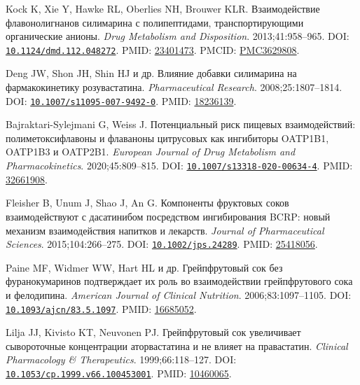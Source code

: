\documentclass[11pt]{article}
\begin{document}
\begin{description}[before={\microtypesetup{expansion=false}\setlength{\RaggedRightRightskip}{0pt plus 4em}\RaggedRight}]
\item[{[85]}] Kock K, Xie Y, Hawke RL, Oberlies NH, Brouwer KLR. Взаимодействие флавонолигнанов силимарина с полипептидами, транспортирующими органические анионы. \textit{\foreignlanguage{english}{Drug Metabolism and Disposition}}. 2013;41:958--965. DOI: \href{https://doi.org/10.1124/dmd.112.048272}{\nolinkurl{10.1124/dmd.112.048272}}. PMID: \href{https://pubmed.ncbi.nlm.nih.gov/23401473/}{23401473}. PMCID: \href{https://pmc.ncbi.nlm.nih.gov/articles/PMC3629808/}{PMC3629808}.
\item[{[86]}] Deng JW, Shon JH, Shin HJ и др. Влияние добавки силимарина на фармакокинетику розувастатина. \textit{\foreignlanguage{english}{Pharmaceutical Research}}. 2008;25:1807--1814. DOI: \href{https://doi.org/10.1007/s11095-007-9492-0}{\nolinkurl{10.1007/s11095-007-9492-0}}. PMID: \href{https://pubmed.ncbi.nlm.nih.gov/18236139/}{18236139}.
\item[{[87]}] Bajraktari-Sylejmani G, Weiss J. Потенциальный риск пищевых взаимодействий: полиметоксифлавоны и флаваноны цитрусовых как ингибиторы OATP1B1, OATP1B3 и OATP2B1. \textit{\foreignlanguage{english}{European Journal of Drug Metabolism and Pharmacokinetics}}. 2020;45:809--815. DOI: \href{https://doi.org/10.1007/s13318-020-00634-4}{\nolinkurl{10.1007/s13318-020-00634-4}}. PMID: \href{https://pubmed.ncbi.nlm.nih.gov/32661908/}{32661908}.
\item[{[88]}] Fleisher B, Unum J, Shao J, An G. Компоненты фруктовых соков взаимодействуют с дасатинибом посредством ингибирования BCRP: новый механизм взаимодействия напитков и лекарств. \textit{\foreignlanguage{english}{Journal of Pharmaceutical Sciences}}. 2015;104:266--275. DOI: \href{https://doi.org/10.1002/jps.24289}{\nolinkurl{10.1002/jps.24289}}. PMID: \href{https://pubmed.ncbi.nlm.nih.gov/25418056/}{25418056}.
\item[{[89]}] Paine MF, Widmer WW, Hart HL и др. Грейпфрутовый сок без фуранокумаринов подтверждает их роль во взаимодействии грейпфрутового сока и фелодипина. \textit{\foreignlanguage{english}{American Journal of Clinical Nutrition}}. 2006;83:1097--1105. DOI: \href{https://doi.org/10.1093/ajcn/83.5.1097}{\nolinkurl{10.1093/ajcn/83.5.1097}}. PMID: \href{https://pubmed.ncbi.nlm.nih.gov/16685052/}{16685052}.
\item[{[90]}] Lilja JJ, Kivisto KT, Neuvonen PJ. Грейпфрутовый сок увеличивает сывороточные концентрации аторвастатина и не влияет на правастатин. \textit{\foreignlanguage{english}{Clinical Pharmacology \& Therapeutics}}. 1999;66:118--127. DOI: \href{https://doi.org/10.1053/cp.1999.v66.100453001}{\nolinkurl{10.1053/cp.1999.v66.100453001}}. PMID: \href{https://pubmed.ncbi.nlm.nih.gov/10460065/}{10460065}.

\end{description}
\end{document}
